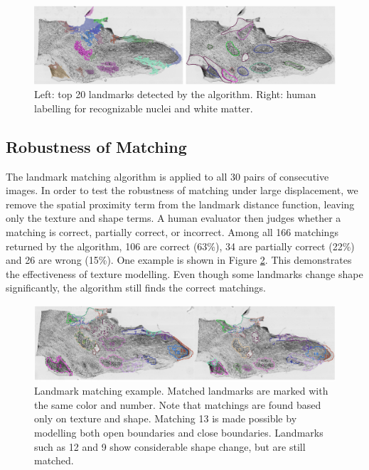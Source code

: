 \documentclass{llncs}
\begin{document}
\begin{figure}
	\includegraphics[width=\textwidth]{../figures/CompareHuman.png}
	\caption{Left: top 20 landmarks detected by the algorithm. Right: human labelling for recognizable nuclei and white matter.}
	\label{fig:TopRegions}
\end{figure}


\subsection{Robustness of Matching}

The landmark matching algorithm is applied to all 30 pairs of consecutive images. In order to test the robustness of matching under large displacement, we remove the spatial proximity term from the landmark distance function, leaving only the texture and shape terms. A human evaluator then judges whether a matching is correct, partially correct, or incorrect. Among all 166 matchings returned by the algorithm, 106 are correct (63\%), 34 are partially correct (22\%) and 26 are wrong (15\%). One example is shown in Figure \ref{fig:LandmarkMatch}. This demonstrates the effectiveness of texture modelling. Even though some landmarks change shape significantly, the algorithm still finds the correct matchings.

\begin{figure}
	\includegraphics[width=\textwidth]{../figures/MatchingHorizontal.png}
	\caption{Landmark matching example. Matched landmarks are marked with the same color and number. Note that matchings are found based only on texture and shape. Matching 13 is made possible by modelling both open boundaries and close boundaries. Landmarks such as 12 and 9 show considerable shape change, but are still matched.}
	\label{fig:LandmarkMatch}
\end{figure}
\end{document}
